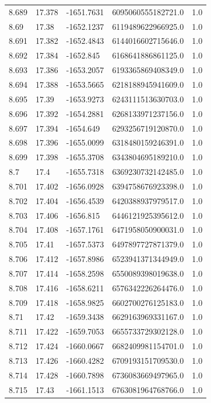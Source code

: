 \begin{tabular}{lllll}
8.689 & 17.378 & -1651.7631 & 6095060555182721.0 & 1.0 \\
8.69 & 17.38 & -1652.1237 & 6119489622966925.0 & 1.0 \\
8.691 & 17.382 & -1652.4843 & 6144016602715646.0 & 1.0 \\
8.692 & 17.384 & -1652.845 & 6168641886861125.0 & 1.0 \\
8.693 & 17.386 & -1653.2057 & 6193365869408349.0 & 1.0 \\
8.694 & 17.388 & -1653.5665 & 6218188945941609.0 & 1.0 \\
8.695 & 17.39 & -1653.9273 & 6243111513630703.0 & 1.0 \\
8.696 & 17.392 & -1654.2881 & 6268133971237156.0 & 1.0 \\
8.697 & 17.394 & -1654.649 & 6293256719120870.0 & 1.0 \\
8.698 & 17.396 & -1655.0099 & 6318480159246391.0 & 1.0 \\
8.699 & 17.398 & -1655.3708 & 6343804695189210.0 & 1.0 \\
8.7 & 17.4 & -1655.7318 & 6369230732142485.0 & 1.0 \\
8.701 & 17.402 & -1656.0928 & 6394758676923398.0 & 1.0 \\
8.702 & 17.404 & -1656.4539 & 6420388937979517.0 & 1.0 \\
8.703 & 17.406 & -1656.815 & 6446121925395612.0 & 1.0 \\
8.704 & 17.408 & -1657.1761 & 6471958050900031.0 & 1.0 \\
8.705 & 17.41 & -1657.5373 & 6497897727871379.0 & 1.0 \\
8.706 & 17.412 & -1657.8986 & 6523941371344949.0 & 1.0 \\
8.707 & 17.414 & -1658.2598 & 6550089398019638.0 & 1.0 \\
8.708 & 17.416 & -1658.6211 & 6576342226264476.0 & 1.0 \\
8.709 & 17.418 & -1658.9825 & 6602700276125183.0 & 1.0 \\
8.71 & 17.42 & -1659.3438 & 6629163969331167.0 & 1.0 \\
8.711 & 17.422 & -1659.7053 & 6655733729302128.0 & 1.0 \\
8.712 & 17.424 & -1660.0667 & 6682409981154701.0 & 1.0 \\
8.713 & 17.426 & -1660.4282 & 6709193151709530.0 & 1.0 \\
8.714 & 17.428 & -1660.7898 & 6736083669497965.0 & 1.0 \\
8.715 & 17.43 & -1661.1513 & 6763081964768766.0 & 1.0 \\

\end{tabular}
